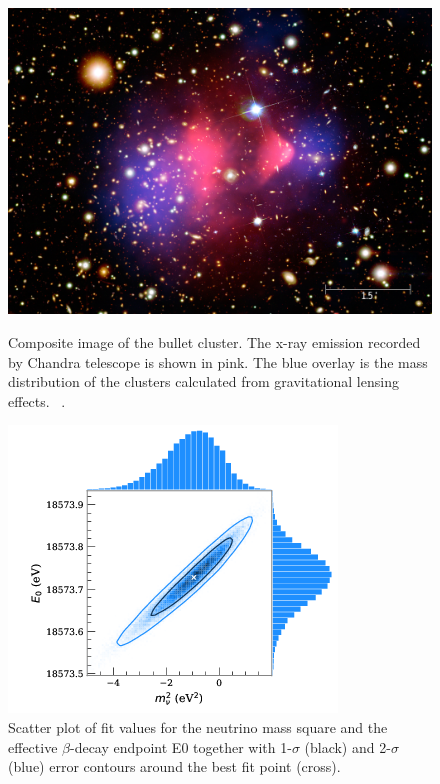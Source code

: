 \begin{figure}[t!]
\centering
  \begin{minipage}[t]{.45\textwidth}
    \centering
    \includegraphics[width=\linewidth]{thesis_figures/bullet_cluster_final.jpg}

    \caption{Composite image of the bullet cluster. The x-ray emission recorded by Chandra telescope is shown in pink. The blue overlay is the mass distribution of the clusters calculated from gravitational lensing effects. ~\cite{NASA}.}
    \label{fig:Bullet2}
  \end{minipage}
  \hfill
  \begin{minipage}[t]{.45\textwidth}
    \centering
    \includegraphics[width=\linewidth]{thesis_figures/neutrino_KATRIN.png}
    \caption{Scatter plot of fit values for the neutrino mass square and the effective $\beta$-decay endpoint E0 together with 1-$\sigma$ (black) and 2-$\sigma$ (blue) error contours around the best fit point (cross).~\cite{Aker:2019uuj}}
    \label{fig:neutrino_mass}
  \end{minipage}
\end{figure}
